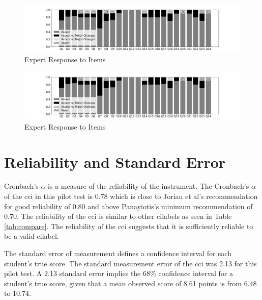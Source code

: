 \iflong
\begin{figure}[!htbp]
    \begin{center}
    \advance\leftskip-3cm
    \advance\rightskip-3cm
    \includegraphics[scale=.4]{images/bar.png}
    \caption{Expert Response to Items}
    \label{fig:accept_rej}
\end{center}
\end{figure}
\fi

\ifshort
\begin{figure}[!htbp]
    \begin{center}
    \advance\leftskip-3cm
    \advance\rightskip-3cm
    \includegraphics[scale=.3]{images/bar.png}
    \caption{Expert Response to Items}
    \label{fig:accept_rej}
\end{center}
\end{figure}
\fi

\FloatBarrier
\section{Reliability and Standard Error}

Cronbach's $\alpha$ is a measure of the reliability of the instrument. The Cronbach's $\alpha$ of the \gls{cci} in this pilot test is 0.78 which is close to Jorian et al's recommendation for good reliability of 0.80 and above Panayiotis's minimum recommendation of 0.70. The reliability of the \gls{cci} is similar to other \glspl{cilabel} as seen in Table \ref{tab:compare}. The reliability of the \gls{cci} suggests that it is sufficiently reliable to be a valid \gls{cilabel}.   


The standard error of measurement defines a confidence interval for each student's true score. The standard measurement error of the \gls{cci} was 2.13 for this pilot test. A 2.13 standard error implies the 68\% confidence interval for a student’s true score, given that a mean observed score of 8.61 points is from 6.48 to 10.74. 

